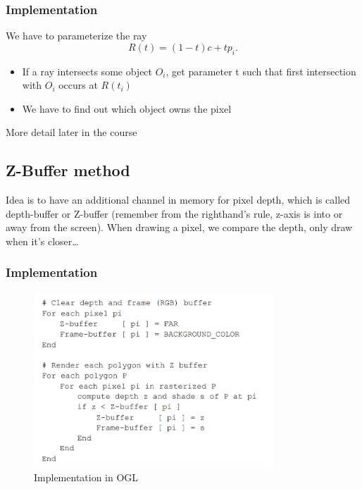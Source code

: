 \documentclass[11pt]{article}
\begin{document}
\subsubsection*{Implementation}
We have to parameterize the ray \[
R(t) = (1-t)c + tp_i
.\] 
\begin{itemize}
    \item If a ray intersects some object $O_i$, get parameter t such that first intersection with $O_i$ occurs at $R(t_i)$
    \item We have to find out which object owns the pixel 
\end{itemize}

More detail later in the course


\subsection{Z-Buffer method}
Idea is to have an additional channel in memory for pixel depth, which is called depth-buffer or Z-buffer (remember from the righthand's rule, z-axis is into or away from the screen). When drawing a pixel, we compare the depth, only draw when it's closer\dots

\subsubsection*{Implementation}
\begin{figure}[h]
    \centering
    \includegraphics[width=0.8\textwidth]{z_buff_implem.png}
    \caption{Implementation in OGL}
    \label{fig:implem_z_buff}
\end{figure}
\end{document}
